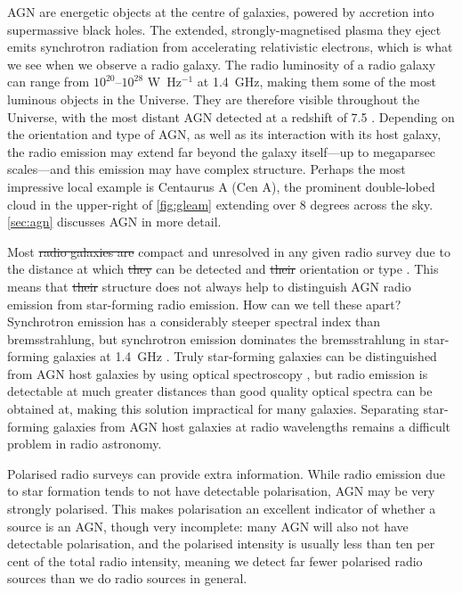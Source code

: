 \documentclass[11pt, a4paper]{book}
\providecommand{\DIFaddtex}[1]{{\protect\color{blue}\uwave{#1}}} %
\providecommand{\DIFdeltex}[1]{{\protect\color{red}\sout{#1}}}                      %
\providecommand{\DIFaddbegin}{} %
\providecommand{\DIFaddend}{} %
\providecommand{\DIFdelbegin}{} %
\providecommand{\DIFdelend}{} %
\providecommand{\DIFadd}[1]{\texorpdfstring{\DIFaddtex{#1}}{#1}} %
\providecommand{\DIFdel}[1]{\texorpdfstring{\DIFdeltex{#1}}{}} %
\newcommand{\DIFscaledelfig}{0.5}
\newlength{\DIFdelgraphicswidth} %
\newlength{\DIFdelgraphicsheight} %
\newcommand{\DIFaddincludegraphics}[2][]{{\color{blue}\fbox{\DIFOincludegraphics[#1]{#2}}}} %
\newcommand{\DIFdelincludegraphics}[2][]{%
\sbox{\DIFdelgraphicsbox}{\DIFOincludegraphics[#1]{#2}}%
\settoboxwidth{\DIFdelgraphicswidth}{\DIFdelgraphicsbox} %
\settoboxtotalheight{\DIFdelgraphicsheight}{\DIFdelgraphicsbox} %
\scalebox{\DIFscaledelfig}{%
\parbox[b]{\DIFdelgraphicswidth}{\usebox{\DIFdelgraphicsbox}\\[-\baselineskip] \rule{\DIFdelgraphicswidth}{0em}}\llap{\resizebox{\DIFdelgraphicswidth}{\DIFdelgraphicsheight}{%
\setlength{\unitlength}{\DIFdelgraphicswidth}%
\begin{picture}(1,1)%
\thicklines\linethickness{2pt} %
{\color[rgb]{1,0,0}\put(0,0){\framebox(1,1){}}}%
{\color[rgb]{1,0,0}\put(0,0){\line( 1,1){1}}}%
{\color[rgb]{1,0,0}\put(0,1){\line(1,-1){1}}}%
\end{picture}%
}\hspace*{3pt}}} %
} %
\DeclareRobustCommand{\DIFaddbegin}{\DIFOaddbegin \let\includegraphics\DIFaddincludegraphics} %
\DeclareRobustCommand{\DIFaddend}{\DIFOaddend \let\includegraphics\DIFOincludegraphics} %
\DeclareRobustCommand{\DIFdelbegin}{\DIFOdelbegin \let\includegraphics\DIFdelincludegraphics} %
\DeclareRobustCommand{\DIFdelend}{\DIFOaddend \let\includegraphics\DIFOincludegraphics} %
\begin{document}
    AGN are energetic objects at the centre of galaxies, powered by accretion into supermassive black holes. The extended, strongly-magnetised plasma they eject emits synchrotron radiation from accelerating relativistic electrons, which is what we see when we observe a radio galaxy. The radio luminosity of a radio galaxy can range from $10^{20}$--$10^{28}$ W~Hz$^{-1}$ \citep{pracy16rlf} at 1.4~GHz, making them some of the most luminous objects in the Universe. They are therefore visible throughout the Universe, with the most distant AGN detected at a redshift of 7.5 \citep{banados_800-million-solar-mass_2018}. Depending on the orientation and type of AGN, as well as its interaction with its host galaxy, the radio emission may extend far beyond the galaxy itself---up to megaparsec scales---and this emission may have complex structure. Perhaps the most impressive local example is Centaurus A (Cen A), the prominent double-lobed cloud in the upper-right of \autoref{fig:gleam} extending over 8 degrees across the sky. \autoref{sec:agn} discusses AGN in more detail.

    Most \DIFdelbegin \DIFdel{radio galaxies are }\DIFdelend \DIFaddbegin \DIFadd{AGN emission is }\DIFaddend compact and unresolved in any given radio survey due to the distance at which \DIFdelbegin \DIFdel{they }\DIFdelend \DIFaddbegin \DIFadd{it }\DIFaddend can be detected and \DIFdelbegin \DIFdel{their }\DIFdelend \DIFaddbegin \DIFadd{the }\DIFaddend orientation or type \DIFaddbegin \DIFadd{of the galaxy}\DIFaddend . This means that \DIFdelbegin \DIFdel{their }\DIFdelend \DIFaddbegin \DIFadd{observed }\DIFaddend structure does not always help to distinguish AGN radio emission from star-forming radio emission. How can we tell these apart? Synchrotron emission has a considerably steeper spectral index than bremsstrahlung, but synchrotron emission dominates the bremsstrahlung in star-forming galaxies at 1.4~GHz \citep{condon92radio}. Truly star-forming galaxies can be distinguished from AGN host galaxies by using optical spectroscopy \citep[e.g.][]{mauch07rlf,groves_distinguishing_2007}, but radio emission is detectable at much greater distances than good quality optical spectra can be obtained at, making this solution impractical for many galaxies. Separating star-forming galaxies from AGN host galaxies at radio wavelengths remains a difficult problem in radio astronomy.

    Polarised radio surveys can provide extra information. While radio emission due to star formation tends to not have detectable polarisation, AGN may be very strongly polarised. This makes polarisation an excellent indicator of whether a source is an AGN, though very incomplete: many AGN will also not have detectable polarisation, and the polarised intensity is usually less than ten per cent of the total radio intensity, meaning we detect far fewer polarised radio sources than we do radio sources in general.
\end{document}
